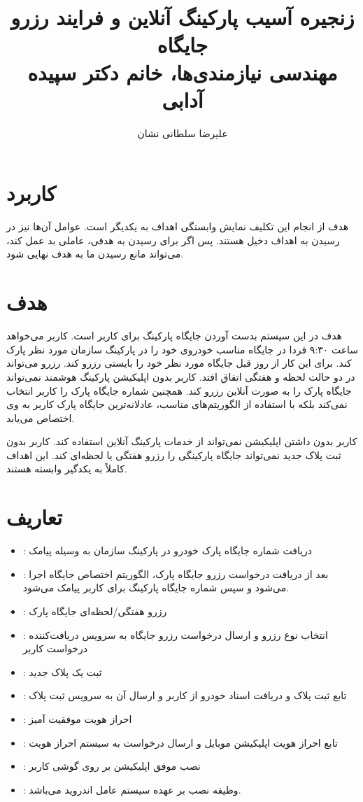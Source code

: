 \documentclass[a4paper]{report}
\title{زنجیره آسیب پارکینگ آنلاین و فرایند رزرو جایگاه \\ مهندسی نیازمندی‌ها،
خانم دکتر سپیده آدابی}
\author{علیرضا سلطانی نشان}
\begin{document}
\maketitle

\section{کاربرد}

هدف از انجام این تکلیف نمایش وابستگی اهداف به یکدیگر است. عوامل آن‌ها نیز در
رسیدن به اهداف دخیل هستند. پس اگر برای رسیدن به هدفی، عاملی بد عمل کند، می‌تواند
مانع رسیدن ما به هدف نهایی شود.

\section{هدف}

هدف در این سیستم بدست آوردن جایگاه پارکینگ برای کاربر است. کاربر می‌خواهد ساعت
۹:۳۰ فردا در جایگاه مناسب خودروی خود را در پارکینگ سازمان مورد نظر پارک کند.
برای این کار از روز قبل جایگاه مورد نظر خود را بایستی رزرو کند. رزرو می‌تواند در
دو حالت لحظه و هفتگی اتفاق افتد. کاربر بدون اپلیکیشن پارکینگ هوشمند نمی‌تواند
جایگاه پارک را به صورت آنلاین رزرو کند. همچنین شماره جایگاه پارک را کاربر انتخاب
نمی‌کند بلکه با استفاده از الگوریتم‌های مناسب، عادلانه‌ترین جایگاه پارک کاربر به
وی اختصاص می‌یابد.

کاربر بدون داشتن اپلیکیشن نمی‌تواند از خدمات پارکینگ آنلاین استفاده کند. کاربر
بدون ثبت پلاک جدید نمی‌تواند جایگاه پارکینگی را رزرو هفتگی یا لحظه‌ای کند. این
اهداف کاملاً به یکدگیر وابسته هستند.

\section{تعاریف}

\begin{itemize}
    \item {}: دریافت شماره جایگاه پارک خودرو در پارکینگ سازمان به وسیله
    پیامک
    \item {}: بعد از دریافت درخواست رزرو جایگاه پارک، الگوریتم اختصاص
    جایگاه اجرا می‌شود و سپس شماره جایگاه پارکینگ برای کاربر پیامک می‌شود.

    \item {}: رزرو هفتگی/لحظه‌ای جایگاه پارک
    \item {}: انتخاب نوع رزرو و ارسال درخواست رزرو جایگاه به سرویس
    دریافت‌کننده درخواست کاربر

    \item {}: ثبت یک پلاک جدید
    \item {}: تابع ثبت پلاک و دریافت اسناد خودرو از کاربر و ارسال آن
    به سرویس ثبت پلاک

    \item {}: احراز هویت موفقیت آمیز
    \item {}: تابع احراز هویت اپلیکیشن موبایل و ارسال درخواست به سیستم
    احراز هویت

    \item {}: نصب موفق اپلیکیشن بر روی گوشی کاربر
    \item {}: وظیفه نصب بر عهده سیستم عامل اندروید می‌باشد.
\end{itemize}
\end{document}
